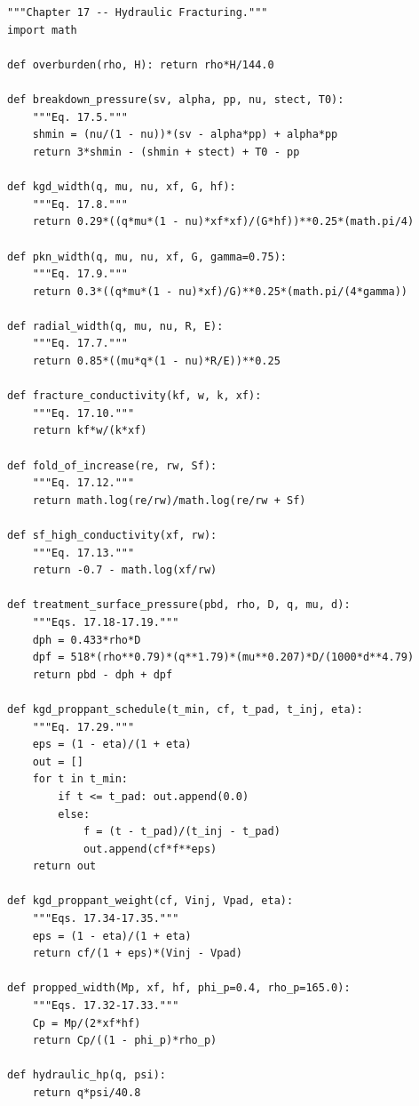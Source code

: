 \documentclass[10pt,a4paper,openany]{book}
\begin{document}
\chapter{}
\begin{lstlisting}
"""Chapter 17 -- Hydraulic Fracturing."""
import math

def overburden(rho, H): return rho*H/144.0

def breakdown_pressure(sv, alpha, pp, nu, stect, T0):
    """Eq. 17.5."""
    shmin = (nu/(1 - nu))*(sv - alpha*pp) + alpha*pp
    return 3*shmin - (shmin + stect) + T0 - pp

def kgd_width(q, mu, nu, xf, G, hf):
    """Eq. 17.8."""
    return 0.29*((q*mu*(1 - nu)*xf*xf)/(G*hf))**0.25*(math.pi/4)

def pkn_width(q, mu, nu, xf, G, gamma=0.75):
    """Eq. 17.9."""
    return 0.3*((q*mu*(1 - nu)*xf)/G)**0.25*(math.pi/(4*gamma))

def radial_width(q, mu, nu, R, E):
    """Eq. 17.7."""
    return 0.85*((mu*q*(1 - nu)*R/E))**0.25

def fracture_conductivity(kf, w, k, xf):
    """Eq. 17.10."""
    return kf*w/(k*xf)

def fold_of_increase(re, rw, Sf):
    """Eq. 17.12."""
    return math.log(re/rw)/math.log(re/rw + Sf)

def sf_high_conductivity(xf, rw):
    """Eq. 17.13."""
    return -0.7 - math.log(xf/rw)

def treatment_surface_pressure(pbd, rho, D, q, mu, d):
    """Eqs. 17.18-17.19."""
    dph = 0.433*rho*D
    dpf = 518*(rho**0.79)*(q**1.79)*(mu**0.207)*D/(1000*d**4.79)
    return pbd - dph + dpf

def kgd_proppant_schedule(t_min, cf, t_pad, t_inj, eta):
    """Eq. 17.29."""
    eps = (1 - eta)/(1 + eta)
    out = []
    for t in t_min:
        if t <= t_pad: out.append(0.0)
        else:
            f = (t - t_pad)/(t_inj - t_pad)
            out.append(cf*f**eps)
    return out

def kgd_proppant_weight(cf, Vinj, Vpad, eta):
    """Eqs. 17.34-17.35."""
    eps = (1 - eta)/(1 + eta)
    return cf/(1 + eps)*(Vinj - Vpad)

def propped_width(Mp, xf, hf, phi_p=0.4, rho_p=165.0):
    """Eqs. 17.32-17.33."""
    Cp = Mp/(2*xf*hf)
    return Cp/((1 - phi_p)*rho_p)

def hydraulic_hp(q, psi):
    return q*psi/40.8
\end{lstlisting}
\end{document}
